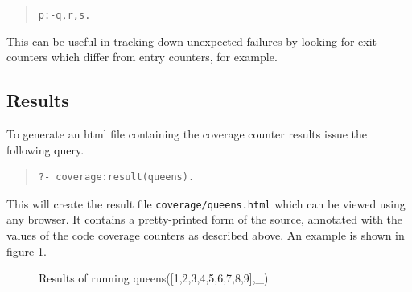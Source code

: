 \begin{quote}\begin{alltt}
p :-  q,  r,  s  .
\end{alltt}\end{quote}

This can be useful in tracking down unexpected failures by looking for
exit counters which differ from entry counters, for example.


\subsection{Results}

  To generate an html file
containing the coverage counter results issue the following query.
\begin{quote}\begin{verbatim}
?- coverage:result(queens).
\end{verbatim}\end{quote}
This will create the result file \texttt{coverage/queens.html} which
can be viewed using any browser.  It contains a pretty-printed form of
the source, annotated with the values of the code coverage counters as
described above. An example is shown in figure \ref{fig:queens}.

\begin{figure}
\begin{center}
\end{center}
\caption{Results of running queens([1,2,3,4,5,6,7,8,9],_)}
\label{fig:queens}
\end{figure}

